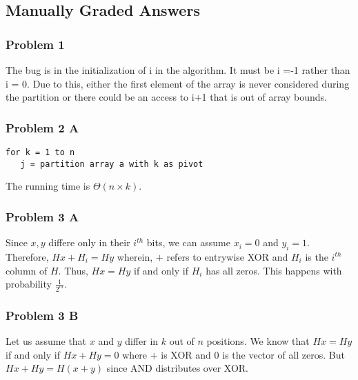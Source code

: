 \documentclass[
]{article}
\begin{document}
\hypertarget{manually-graded-answers}{%
\subsection{Manually Graded Answers}\label{manually-graded-answers}}

\hypertarget{problem-1}{%
\subsubsection{Problem 1}\label{problem-1}}

The bug is in the initialization of i in the algorithm. It must be i =-1
rather than i = 0. Due to this, either the first element of the array is
never considered during the partition or there could be an access to i+1
that is out of array bounds.


\hypertarget{problem-2-a}{%
\subsubsection{Problem 2 A}\label{problem-2-a}}

\begin{verbatim}
for k = 1 to n
   j = partition array a with k as pivot
\end{verbatim}

The running time is \(\Theta(n \times k)\).

\hypertarget{problem-3-a}{%
\subsubsection{Problem 3 A}\label{problem-3-a}}

Since \(x,y\) differe only in their \(i^{th}\) bits, we can assume
\(x_i = 0\) and \(y_i = 1\). Therefore, \(H x + H_i = Hy\) wherein,
\(+\) refers to entrywise XOR and \(H_i\) is the \(i^{th}\) column of
\(H\). Thus, \(Hx = Hy\) if and only if \(H_i\) has all zeros. This
happens with probability \(\frac{1}{2^m}\).

\hypertarget{problem-3-b}{%
\subsubsection{Problem 3 B}\label{problem-3-b}}

Let us assume that \(x\) and \(y\) differ in \(k\) out of \(n\)
positions. We know that \(Hx = Hy\) if and only if \(Hx + Hy = 0\) where
\(+\) is XOR and \(0\) is the vector of all zeros. But
\(Hx + Hy = H (x + y)\) since AND distributes over XOR.
\end{document}
